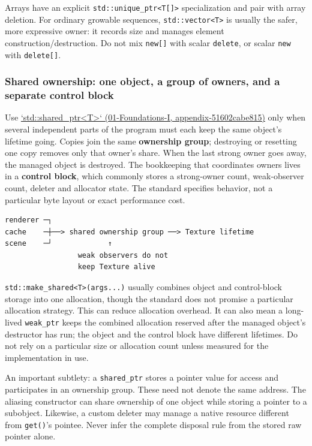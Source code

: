 Arrays have an explicit \texttt{std::unique\_ptr\textless{}T{[}{]}\textgreater{}} specialization and pair with array deletion. For ordinary growable sequences, \texttt{std::vector\textless{}T\textgreater{}} is usually the safer, more expressive owner: it records size and manages element construction/destruction. Do not mix \texttt{new{[}{]}} with scalar \texttt{delete}, or scalar \texttt{new} with \texttt{delete{[}{]}}.

\subsubsection{Shared ownership: one object, a group of owners, and a separate control block}\label{shared-ownership-one-object-a-group-of-owners-and-a-separate-control-block}

Use \href{}{`std::shared\_ptr\textless T\textgreater` (01-Foundations-I, appendix-51602cabe815)} only when several independent parts of the program must each keep the same object's lifetime going. Copies join the same \textbf{ownership group}; destroying or resetting one copy removes only that owner's share. When the last strong owner goes away, the managed object is destroyed. The bookkeeping that coordinates owners lives in a \textbf{control block}, which commonly stores a strong-owner count, weak-observer count, deleter and allocator state. The standard specifies behavior, not a particular byte layout or exact performance cost.

\begin{verbatim}
renderer ─┐
cache    ─┼──> shared ownership group ──> Texture lifetime
scene    ─┘             ↑
                 weak observers do not
                 keep Texture alive
\end{verbatim}

\texttt{std::make\_shared\textless{}T\textgreater{}(args...)} usually combines object and control-block storage into one allocation, though the standard does not promise a particular allocation strategy. This can reduce allocation overhead. It can also mean a long-lived \texttt{weak\_ptr} keeps the combined allocation reserved after the managed object's destructor has run; the object and the control block have different lifetimes. Do not rely on a particular size or allocation count unless measured for the implementation in use.

An important subtlety: a \texttt{shared\_ptr} stores a pointer value for access and participates in an ownership group. These need not denote the same address. The aliasing constructor can share ownership of one object while storing a pointer to a subobject. Likewise, a custom deleter may manage a native resource different from \texttt{get()}'s pointee. Never infer the complete disposal rule from the stored raw pointer alone.

